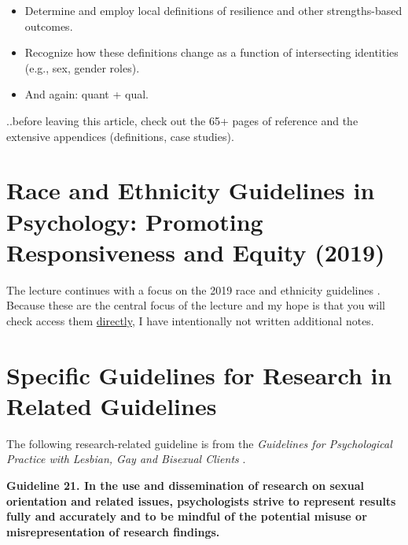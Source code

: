 \documentclass[
  english,
]{book}
\providecommand{\tightlist}{%
  \setlength{\itemsep}{0pt}\setlength{\parskip}{0pt}}
\begin{document}
\begin{itemize}
\tightlist
\item
  Determine and employ local definitions of resilience and other strengths-based outcomes.
\item
  Recognize how these definitions change as a function of intersecting identities (e.g., sex, gender roles).
\item
  And again: quant + qual.
\end{itemize}

..before leaving this article, check out the 65+ pages of reference and the extensive appendices (definitions, case studies).

\hypertarget{race-and-ethnicity-guidelines-in-psychology-promoting-responsiveness-and-equity-2019}{%
\section{Race and Ethnicity Guidelines in Psychology: Promoting Responsiveness and Equity (2019)}\label{race-and-ethnicity-guidelines-in-psychology-promoting-responsiveness-and-equity-2019}}

The lecture continues with a focus on the 2019 race and ethnicity guidelines \citep{apa_task_force_on_race_and_ethnicity_guidelines_in_psychology_apa_2019}. Because these are the central focus of the lecture and my hope is that you will check access them \href{https://www.apa.org/about/policy/guidelines-race-ethnicity.pdf}{directly}, I have intentionally not written additional notes.

\hypertarget{specific-guidelines-for-research-in-related-guidelines}{%
\section{Specific Guidelines for Research in Related Guidelines}\label{specific-guidelines-for-research-in-related-guidelines}}

The following research-related guideline is from the \emph{Guidelines for Psychological Practice with Lesbian, Gay and Bisexual Clients} \citep{american_psychological_association_guidelines_2012}.

\textbf{Guideline 21. In the use and dissemination of research on sexual orientation and related issues, psychologists strive to represent results fully and accurately and to be mindful of the potential misuse or misrepresentation of research findings.}
\end{document}
